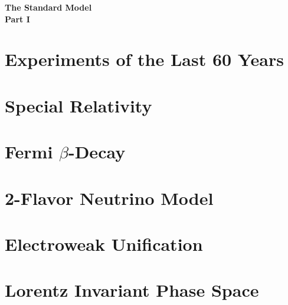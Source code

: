 \documentclass{report}
\begin{document}
  \begin{titlepage}
    \phantom{\,}
    \vfill
    \centering
    {\huge\textbf{The Standard Model}}\\
    \vspace{\parskip}
    {\Large\textbf{Part I}}
    \vspace{5em}
    \vfill
  \end{titlepage}

  

  \tableofcontents

  
  
  
  
  
  
  
  
  
  
  
  
  
  

  \appendix
  \chapter{Experiments of the Last 60 Years}
  \label{apx:ExperimentalHighlights}
  

  \chapter{Special Relativity}
  

  \chapter{Fermi $\beta$-Decay}
  

  \chapter{2-Flavor Neutrino Model}
  

  \chapter{Electroweak Unification}
  

  \chapter{Lorentz Invariant Phase Space}
  
\end{document}
